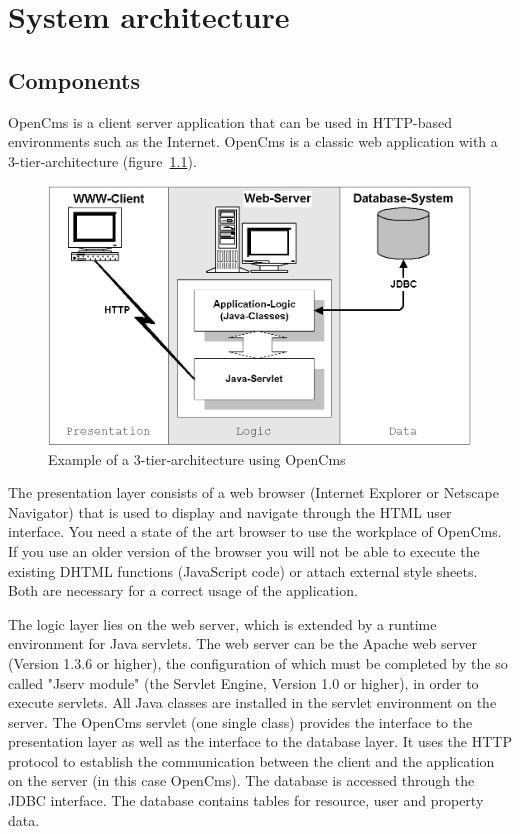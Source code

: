 \chapter{System architecture}

\section{Components}
OpenCms is a client server application that can be used in HTTP-based
environments such as the Internet. OpenCms is a classic web application
with a 3-tier-architecture (figure~\ref {3-tier1}).

\begin{figure}
\begin{center}
\includegraphics[clip,width=\sgw]{pics/modules/1}
\end{center}
\caption[3-tier-achitecture]{Example of a 3-tier-architecture using OpenCms}
\label{3-tier1}
\end{figure}

The presentation layer consists of a web browser (Internet Explorer or
Netscape Navigator) that is used to display and navigate through the HTML
user interface. You need a state of the art browser to use the workplace 
of OpenCms. If you use an older version of the browser you will not be able
to execute the existing DHTML functions (JavaScript code) or attach
external style sheets. Both are necessary for a correct  usage of the
application.

The logic layer lies on the web server, which is extended by a runtime
environment for Java servlets. The web server can be the Apache web
server (Version 1.3.6 or higher), the configuration of which must be
completed by the so called "Jserv module" (the Servlet Engine,
Version 1.0 or higher), in order to execute servlets. All Java classes
are installed in the servlet environment on the server.
The OpenCms servlet (one single class) provides the interface to the
presentation layer as well as the interface to the database layer. It
uses the HTTP protocol to establish the communication between the
client and the application on the server (in this case OpenCms).
The database is accessed through the JDBC interface. The database
contains tables for resource, user and property data.

